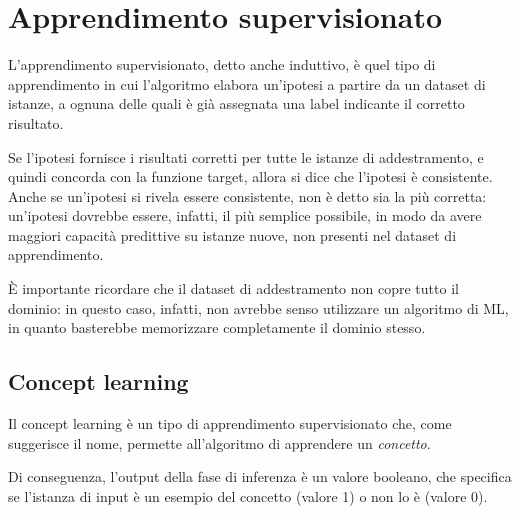 \chapter{Apprendimento supervisionato}
L'apprendimento supervisionato, detto anche induttivo, è quel tipo di apprendimento in cui l'algoritmo elabora un'ipotesi a partire da un dataset di istanze, a ognuna delle quali è già assegnata una label indicante il corretto risultato.

Se l'ipotesi fornisce i risultati corretti per tutte le istanze di addestramento, e quindi concorda con la funzione target, allora si dice che l'ipotesi è consistente. 
Anche se un'ipotesi si rivela essere consistente, non è detto sia la più corretta: un'ipotesi dovrebbe essere, infatti, il più semplice possibile, in modo da avere maggiori capacità predittive su istanze nuove, non presenti nel dataset di apprendimento.

È importante ricordare che il dataset di addestramento non copre tutto il dominio: in questo caso, infatti, non avrebbe senso utilizzare un algoritmo di ML, in quanto basterebbe memorizzare completamente il dominio stesso.

\section{Concept learning}
Il concept learning è un tipo di apprendimento supervisionato che, come suggerisce il nome, permette all'algoritmo di apprendere un \textit{concetto}.

Di conseguenza, l'output della fase di inferenza è un valore booleano, che specifica se l'istanza di input è un esempio del concetto (valore 1) o non lo è (valore 0).


